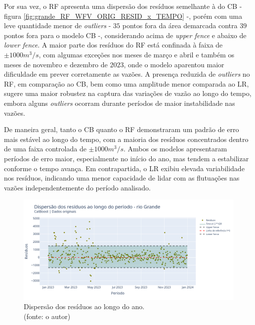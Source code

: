 Por sua vez, o RF apresenta uma dispersão dos resíduos semelhante à do CB - figura \ref{fig:grande_RF_WFV_ORIG_RESID_x_TEMPO} -, porém com uma leve quantidade menor de \textit{outliers} - $35$ pontos fora da área demarcada contra $39$ pontos fora para o modelo CB -, considerando acima de \textit{upper fence} e abaixo de \textit{lower fence}. A maior parte dos resíduos do RF está confinada à faixa de $\pm 1000 m^3/s$, com algumas exceções nos meses de março e abril e também os meses de novembro e dezembro de $2023$, onde o modelo aparentou maior dificuldade em prever corretamente as vazões. A presença reduzida de \textit{outliers} no RF, em comparação ao CB, bem como uma amplitude menor comparada ao LR, sugere uma maior robustez na captura das variações de vazão ao longo do tempo, embora alguns \textit{outliers} ocorram durante períodos de maior instabilidade nas vazões.

De maneira geral, tanto o CB quanto o RF demonstraram um padrão de erro mais estável ao longo do tempo, com a maioria dos resíduos concentrados dentro de uma faixa controlada de $\pm 1000 m^3/s$. Ambos os modelos apresentaram períodos de erro maior, especialmente no início do ano, mas tendem a estabilizar conforme o tempo avança. Em contrapartida, o LR exibiu elevada variabilidade nos resíduos, indicando uma menor capacidade de lidar com as flutuações nas vazões independentemente do período analisado.

\begin{figure}[!h]
	\centering
	\includegraphics[scale=0.33]{Figuras/rio_grande/wfv/CB/CB_WFV_ORIG_RESID_x_TEMPO.png}
	\caption{Dispersão dos resíduos ao longo do ano.\\(fonte: o autor)}
	\label{fig:grande_CB_WFV_ORIG_RESID_x_TEMPO}
\end{figure}

